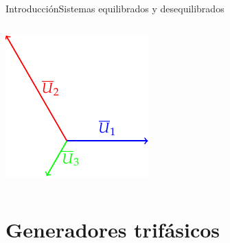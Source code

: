\documentclass[aspectratio=169, xcolor={usenames,svgnames,dvipsnames}]{beamer}
\begin{document}
\begin{frame}{Introducción}{Sistemas equilibrados y desequilibrados}
\begin{columns}
\pause\begin{column}{0.3\linewidth}
\begin{center}
    \includegraphics[width=\linewidth]{../figs/fasores_desq2.pdf}
\end{center}
\end{column}
\end{columns}
\end{frame}

\section{Generadores trifásicos}
\end{document}
